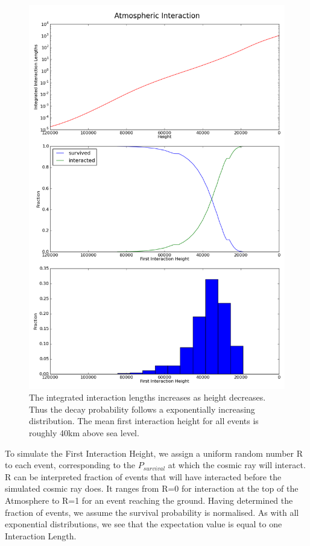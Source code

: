 \documentclass{article}
\begin{document}
\begin{figure}
\begin{center}
\includegraphics[height=0.9\textheight]{generalheight}
\caption{The integrated interaction lengths increases as height decreases. Thus the decay probability follows a exponentially increasing distribution. The mean first interaction height for all events is roughly 40km above sea level.}
\label{fig:generalheight}
\end{center}
\end{figure}

To simulate the First Interaction Height, we assign a uniform random number R to each event, corresponding to the $P_{survival}$ at which the cosmic ray will interact. R can be interpreted fraction of events that will have interacted before the simulated cosmic ray does. It ranges from R=0 for interaction at the top of the Atmosphere to R=1 for an event reaching the ground. Having determined the fraction of events, we assume the survival probability is normalised. As with all exponential distributions, we see that the expectation value is equal to one Interaction Length.
\end{document}
